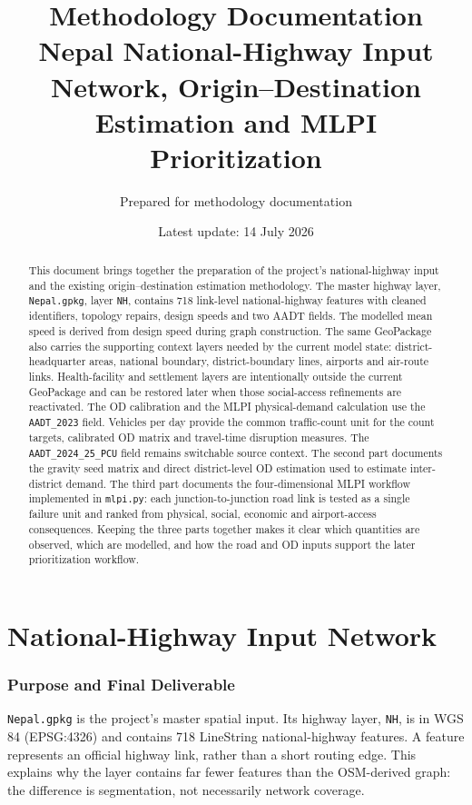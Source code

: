 \documentclass[11pt,a4paper]{article}
\title{\textbf{Methodology Documentation}\\
\large Nepal National-Highway Input Network, Origin--Destination Estimation and MLPI Prioritization}
\author{Prepared for methodology documentation}
\date{Latest update: 14 July 2026}
\begin{document}
\maketitle

\begin{abstract}
This document brings together the preparation of the project's national-highway
input and the existing origin--destination estimation methodology. The master
highway layer, \texttt{Nepal.gpkg}, layer \texttt{NH}, contains 718 link-level national-highway
features with cleaned identifiers, topology repairs, design speeds and two
AADT fields. The modelled mean speed is derived from design speed during graph
construction. The same GeoPackage also carries the supporting context layers
needed by the current model state: district-headquarter areas, national
boundary, district-boundary lines, airports and air-route links. Health-facility and settlement layers
are intentionally outside the current GeoPackage and can be restored later when
those social-access refinements are reactivated. The OD calibration and the
MLPI physical-demand calculation use the \texttt{AADT\_2023} field.
Vehicles per day provide the common traffic-count unit for the count
targets, calibrated OD matrix and travel-time disruption measures. The
\texttt{AADT\_2024\_25\_PCU} field remains switchable source context. The second
part documents the gravity seed matrix and direct district-level OD
estimation used to estimate inter-district demand. The third part
documents the four-dimensional MLPI workflow implemented in
\texttt{mlpi.py}: each junction-to-junction road link is tested as a single
failure unit and ranked from physical, social, economic and airport-access
consequences. Keeping the three parts together makes it clear which quantities
are observed, which are modelled, and how the road and OD inputs support the
later prioritization workflow.
\end{abstract}

\part{National-Highway Input Network}

\section{Purpose and Final Deliverable}

\texttt{Nepal.gpkg} is the project's master spatial input. Its highway layer,
\texttt{NH}, is in WGS 84 (EPSG:4326) and contains 718 LineString
national-highway features. A feature represents an official highway link,
rather than a short routing edge. This explains why the layer contains far
fewer features than the OSM-derived graph: the difference is segmentation, not
necessarily network coverage.
\end{document}

